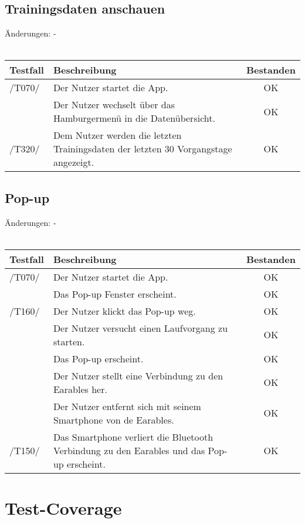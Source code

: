 \documentclass[a4paper,12pt]{article}
\begin{document}
\subsection{Trainingsdaten anschauen}
Änderungen: -
\\
\\
\begin{tabular}{ |p{1.5cm} | p{12cm} | c| }
	\hline
	\textbf{Testfall} & \textbf{Beschreibung} & \textbf{Bestanden}\\
	\hline
	/T070/ & Der Nutzer startet die App. & OK\\
	\hline
	& Der Nutzer wechselt über das Hamburgermenü in die Datenübersicht. & OK \\
	\hline
	/T320/ & Dem Nutzer werden die letzten Trainingsdaten der letzten 30 Vorgangstage angezeigt. & OK \\
	\hline
\end{tabular}

\subsection{Pop-up}
Änderungen: -
\\
\\
\begin{tabular}{ |p{1.5cm} | p{12cm} | c| }
	\hline
	\textbf{Testfall} & \textbf{Beschreibung} & \textbf{Bestanden}\\
	\hline
	/T070/ & Der Nutzer startet die App. & OK\\
	\hline
	& Das Pop-up Fenster erscheint. & OK \\
	\hline
	/T160/ & Der Nutzer klickt das Pop-up weg. & OK \\
	\hline
	& Der Nutzer versucht einen Laufvorgang zu starten. & OK \\
	\hline
	& Das Pop-up erscheint. & OK \\
	\hline
	& Der Nutzer stellt eine Verbindung zu den Earables her. & OK \\
	\hline
	& Der Nutzer entfernt sich mit seinem Smartphone von de Earables. & OK \\
	\hline
	/T150/ & Das Smartphone verliert die Bluetooth Verbindung zu den Earables und das Pop-up erscheint. & OK \\
	\hline
\end{tabular}



\section{Test-Coverage}
\end{document}
